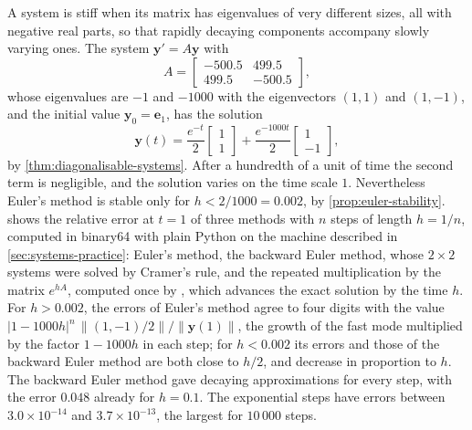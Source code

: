 A system is stiff when its matrix has eigenvalues of very different sizes, all with negative real parts, so that rapidly decaying components accompany slowly varying ones. The system $\mathbf y'=A\mathbf y$ with
\[
A=\begin{bmatrix}-500.5&499.5\\499.5&-500.5\end{bmatrix},
\]
whose eigenvalues are $-1$ and $-1000$ with the eigenvectors $(1,1)$ and $(1,-1)$, and the initial value $\mathbf y_0=\mathbf e_1$, has the solution
\[
\mathbf y(t)=\frac{e^{-t}}2\begin{bmatrix}1\\1\end{bmatrix}+\frac{e^{-1000t}}2\begin{bmatrix}1\\-1\end{bmatrix},
\]
by \cref{thm:diagonalisable-systems}. After a hundredth of a unit of time the second term is negligible, and the solution varies on the time scale $1$. Nevertheless Euler's method is stable only for $h<2/1000=0.002$, by \cref{prop:euler-stability}.  shows the relative error at $t=1$ of three methods with $n$ steps of length $h=1/n$, computed in binary64 with plain Python on the machine described in \cref{sec:systems-practice}: Euler's method, the backward Euler method, whose $2\times2$ systems were solved by Cramer's rule, and the repeated multiplication by the matrix $e^{hA}$, computed once by , which advances the exact solution by the time $h$. For $h>0.002$, the errors of Euler's method agree to four digits with the value $|1-1000h|^n\,\|(1,-1)/2\|/\|\mathbf y(1)\|$, the growth of the fast mode multiplied by the factor $1-1000h$ in each step; for $h<0.002$ its errors and those of the backward Euler method are both close to $h/2$, and decrease in proportion to $h$. The backward Euler method gave decaying approximations for every step, with the error $0.048$ already for $h=0.1$. The exponential steps have errors between $3.0\times10^{-14}$ and $3.7\times10^{-13}$, the largest for $10\,000$ steps.

